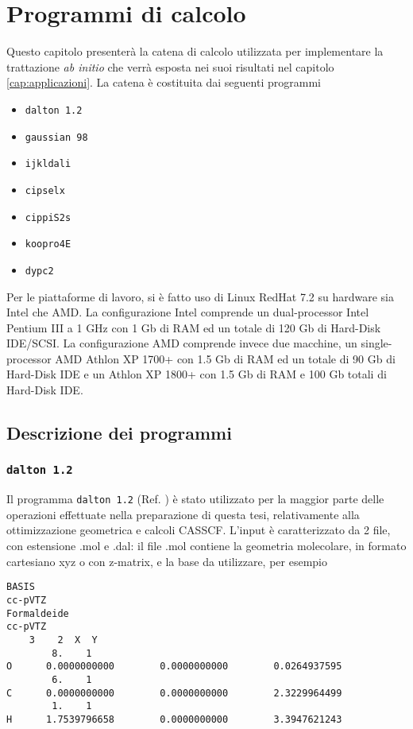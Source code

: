 \pagebreak
\chapter{Programmi di calcolo}

Questo capitolo presenter\`a la catena di calcolo utilizzata per implementare
la trattazione \textit{ab initio} che verr\`a esposta nei suoi risultati nel
capitolo \ref{cap:applicazioni}. La catena \`e costituita dai seguenti
programmi
\begin{itemize}
\item \texttt{dalton 1.2}
\item \texttt{gaussian 98}
\item \texttt{ijkldali}
\item \texttt{cipselx}
\item \texttt{cippiS2s}
\item \texttt{koopro4E}
\item \texttt{dypc2}
\end{itemize}

Per le piattaforme di lavoro, si \`e fatto uso di Linux RedHat 7.2 su hardware
sia Intel che AMD. La configurazione Intel comprende un dual-processor 
Intel Pentium III a 1 GHz con 1 Gb di RAM ed un totale di 120 Gb di Hard-Disk
IDE/SCSI. La configurazione AMD comprende invece due macchine, 
un single-processor AMD
Athlon XP 1700+ con 1.5 Gb di RAM ed un totale di 90 Gb di Hard-Disk IDE
e un Athlon XP 1800+ con 1.5 Gb di RAM e 100 Gb totali di Hard-Disk IDE.


\section{Descrizione dei programmi}

\subsection{\texttt{dalton 1.2}}

Il programma \texttt{dalton 1.2} (Ref. \cite{dalton-site}) \`e stato utilizzato per la
maggior parte delle operazioni effettuate nella preparazione di questa tesi,
relativamente alla ottimizzazione geometrica e calcoli CASSCF. L'input \`e
caratterizzato da 2 file, con estensione .mol e .dal: il file .mol
contiene la geometria molecolare, in formato cartesiano xyz o con z-matrix,
e la base da utilizzare, per esempio
\begin{verbatim}
BASIS
cc-pVTZ
Formaldeide
cc-pVTZ
    3    2  X  Y
        8.    1
O      0.0000000000        0.0000000000        0.0264937595
        6.    1
C      0.0000000000        0.0000000000        2.3229964499
        1.    1
H      1.7539796658        0.0000000000        3.3947621243
\end{verbatim}

